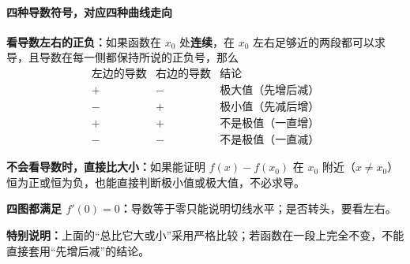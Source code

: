 \begin{statementbox}
	\paragraph{四种导数符号，对应四种曲线走向}
	\textbf{看导数左右的正负：}如果函数在 $x_0$ 处\textbf{连续}，在 $x_0$ 左右足够近的两段都可以求导，且导数在每一侧都保持所说的正负号，那么
	\[
		\begin{array}{c|c|c}
			\text{左边的导数} & \text{右边的导数} & \text{结论}        \\ \hline
			+            & -            & \text{极大值（先增后减）} \\
			-            & +            & \text{极小值（先减后增）} \\
			+            & +            & \text{不是极值（一直增）} \\
			-            & -            & \text{不是极值（一直减）}
		\end{array}
	\]

	\begin{center}\end{center}
	\textbf{不会看导数时，直接比大小：}如果能证明 $f(x)-f(x_0)$ 在 $x_0$ 附近（$x\ne x_0$）恒为正或恒为负，也能直接判断极小值或极大值，不必求导。

	\textbf{四图都满足 $f'(0)=0$：}导数等于零只能说明切线水平；是否转头，要看左右。

	\textbf{特别说明：}上面的“总比它大或小”采用严格比较；若函数在一段上完全不变，不能直接套用“先增后减”的结论。
\end{statementbox}
